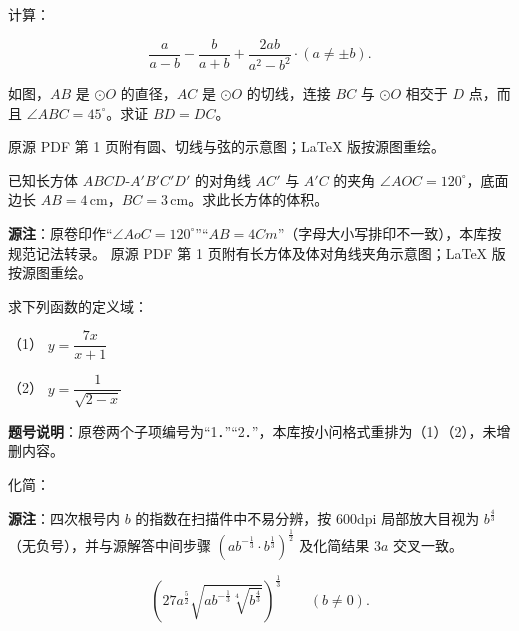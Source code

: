 \begin{question}
计算：

\nopagebreak[4]
\[
\frac{a}{a-b}-\frac{b}{a+b}+\frac{2ab}{a^2-b^2}\cdot(a\ne\pm b).
\]

\Needspace{0.4\textheight}
\end{question}
\begin{question}
如图，$AB$ 是 $\odot O$ 的直径，$AC$ 是 $\odot O$ 的切线，连接 $BC$ 与 $\odot O$ 相交于 $D$ 点，而且 $\angle ABC=45^\circ$。求证 $BD=DC$。

\begin{gktip}
原源 PDF 第 1 页附有圆、切线与弦的示意图；LaTeX 版按源图重绘。
\end{gktip}
\nopagebreak[4]
\begin{center}\end{center}
\nopagebreak[4]
\Needspace{0.4\textheight}
\end{question}
\begin{question}
已知长方体 $ABCD\text{-}A'B'C'D'$ 的对角线 $AC'$ 与 $A'C$ 的夹角 $\angle AOC=120^\circ$，底面边长 $AB=4\,\mathrm{cm}$，$BC=3\,\mathrm{cm}$。求此长方体的体积。

\begin{gktip}
\textbf{源注}：原卷印作“$\angle AoC=120^\circ$”“$AB=4Cm$”（字母大小写排印不一致），本库按规范记法转录。
原源 PDF 第 1 页附有长方体及体对角线夹角示意图；LaTeX 版按源图重绘。
\end{gktip}
\nopagebreak[4]
\begin{center}\end{center}
\nopagebreak[4]
\end{question}
\begin{question}
求下列函数的定义域：

（1） $y=\dfrac{7x}{x+1}$

（2） $y=\dfrac{1}{\sqrt{2-x}}$

\begin{gktip}
\textbf{题号说明}：原卷两个子项编号为“1．”“2．”，本库按小问格式重排为（1）（2），未增删内容。
\end{gktip}

\end{question}
\begin{question}
化简：

\begin{gktip}
\textbf{源注}：四次根号内 $b$ 的指数在扫描件中不易分辨，按 600dpi 局部放大目视为 $b^{\frac43}$（无负号），并与源解答中间步骤 $(ab^{-\frac13}\cdot b^{\frac13})^{\frac12}$ 及化简结果 $3a$ 交叉一致。
\end{gktip}

\nopagebreak[4]
\[
\left(27a^{\frac52}\sqrt{ab^{-\frac13}\sqrt[4]{b^{\frac43}}}\right)^{\frac13}\qquad(b\ne0).
\]

\end{question}
